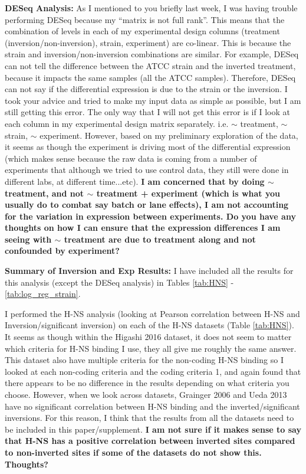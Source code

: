 \documentclass[12pt]{article}
\begin{document}
\textbf{DESeq Analysis:}
As I mentioned to you briefly last week, I was having trouble performing DESeq because my ``matrix is not full rank''. 
This means that the combination of levels in each of my experimental design columns (treatment (inversion/non-inversion), strain, experiment) are co-linear.
This is because the strain and inversion/non-inversion combinations are similar.
For example, DESeq can not tell the difference between the ATCC strain and the inverted treatment, because it impacts the same samples (all the ATCC samples).
Therefore, DESeq can not say if the differential expression is due to the strain or the inversion.
I took your advice and tried to make my input data as simple as possible, but I am still getting this error.
The only way that I will not get this error is if I look at each column in my experimental design matrix separately. 
i.e. $\sim$ treatment, $\sim$ strain, $\sim$ experiment.
However, based on my preliminary exploration of the data, it seems as though the experiment is driving most of the differential expression (which makes sense because the raw data is coming from a number of experiments that although we tried to use control data, they still were done in different labs, at different time...etc).
\textbf{I am concerned that by doing $\sim$ treatment, and not $\sim$ treatment + experiment (which is what you usually do to combat say batch or lane effects), I am not accounting for the variation in expression between experiments. Do you have any thoughts on how I can ensure that the expression differences I am seeing with $\sim$ treatment are due to treatment along and not confounded by experiment? }
 
\textbf{Summary of Inversion and Exp Results:}
I have included all the results for this analysis (except the DESeq analysis) in Tables \ref{tab:HNS} - \ref{tab:log_reg_strain}.

I performed the H-NS analysis (looking at Pearson correlation between H-NS and Inversion/significant inversion) on each of the H-NS datasets (Table \ref{tab:HNS}).
It seems as though within the Higashi 2016 dataset, it does not seem to matter which criteria for H-NS binding I use, they all give me roughly the same answer.
This dataset also have multiple criteria for the non-coding H-NS binding so I looked at each non-coding criteria and the coding criteria 1, and again found that there appears to be no difference in the results depending on what criteria you choose.
However, when we look across datasets, Grainger 2006 and Ueda 2013 have no significant correlation between H-NS binding and the inverted/significant inversions.
For this reason, I think that the results from all the datasets need to be included in this paper/supplement.
\textbf{I am not sure if it makes sense to say that H-NS has a positive correlation between inverted sites compared to non-inverted sites if some of the datasets do not show this. Thoughts?}
\end{document}
